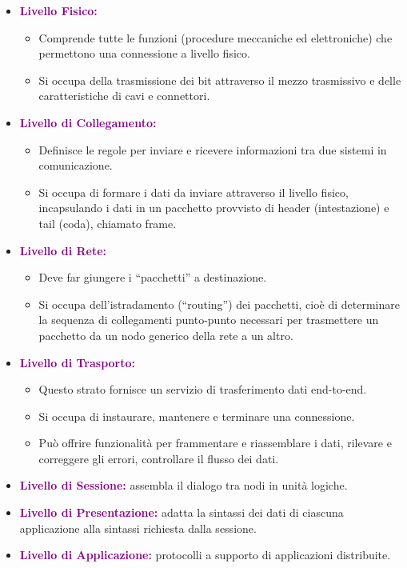 \begin{itemize}
    \item \textbf{\textcolor{purple}{Livello Fisico:}} 
        \begin{itemize}
        \item Comprende tutte le funzioni (procedure meccaniche ed elettroniche) che permettono una connessione a livello fisico.
        \item Si occupa della trasmissione dei bit attraverso il mezzo trasmissivo e delle caratteristiche di cavi e connettori.
        \end{itemize}
    \item \textbf{\textcolor{purple}{Livello di Collegamento:}} 
        \begin{itemize}
            \item Definisce le regole per inviare e ricevere informazioni tra due sistemi in comunicazione.
            \item Si occupa di formare i dati da inviare attraverso il livello fisico, incapsulando i dati in un pacchetto provvisto di header (intestazione) e tail (coda), chiamato frame.
        \end{itemize}
    \newpage
    \item \textbf{\textcolor{purple}{Livello di Rete:}}
        \begin{itemize}
            \item Deve far giungere i “pacchetti” a destinazione.
            \item Si occupa dell’istradamento (“routing”) dei pacchetti, cioè di determinare la sequenza di collegamenti punto-punto necessari per trasmettere un pacchetto da un nodo generico della rete a un altro.
        \end{itemize}
    \item \textbf{\textcolor{purple}{Livello di Trasporto:}}    
        \begin{itemize}
            \item Questo strato fornisce un servizio di trasferimento dati end-to-end.
            \item Si occupa di instaurare, mantenere e terminare una connessione.
            \item Può offrire funzionalità per frammentare e riassemblare i dati, rilevare e correggere gli errori, controllare il flusso dei dati.
        \end{itemize}
    \item \textbf{\textcolor{purple}{Livello di Sessione:}} assembla il dialogo tra nodi in unità logiche.
    \item \textbf{\textcolor{purple}{Livello di Presentazione:}} adatta la sintassi dei dati di ciascuna applicazione alla sintassi richiesta dalla sessione.
    \item \textbf{\textcolor{purple}{Livello di Applicazione:}} protocolli a supporto di applicazioni distribuite.
\end{itemize}

